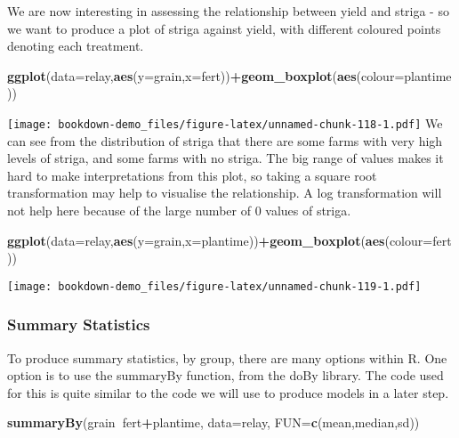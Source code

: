 \documentclass[]{book}
\newenvironment{Shaded}{\begin{snugshade}}{\end{snugshade}}
\newcommand{\KeywordTok}[1]{\textcolor[rgb]{0.13,0.29,0.53}{\textbf{#1}}}
\newcommand{\DataTypeTok}[1]{\textcolor[rgb]{0.13,0.29,0.53}{#1}}
\newcommand{\OperatorTok}[1]{\textcolor[rgb]{0.81,0.36,0.00}{\textbf{#1}}}
\newcommand{\NormalTok}[1]{#1}
\theoremstyle{definition}
\theoremstyle{definition}
\theoremstyle{definition}
\theoremstyle{remark}
\begin{document}
We are now interesting in assessing the relationship between yield and
striga - so we want to produce a plot of striga against yield, with
different coloured points denoting each treatment.

\begin{Shaded}
\begin{Highlighting}[]
\KeywordTok{ggplot}\NormalTok{(}\DataTypeTok{data=}\NormalTok{relay,}\KeywordTok{aes}\NormalTok{(}\DataTypeTok{y=}\NormalTok{grain,}\DataTypeTok{x=}\NormalTok{fert))}\OperatorTok{+}\KeywordTok{geom_boxplot}\NormalTok{(}\KeywordTok{aes}\NormalTok{(}\DataTypeTok{colour=}\NormalTok{plantime))}
\end{Highlighting}
\end{Shaded}

\texttt{[image: bookdown-demo\_files/figure-latex/unnamed-chunk-118-1.pdf]}
We can see from the distribution of striga that there are some farms
with very high levels of striga, and some farms with no striga. The big
range of values makes it hard to make interpretations from this plot, so
taking a square root transformation may help to visualise the
relationship. A log transformation will not help here because of the
large number of 0 values of striga.

\begin{Shaded}
\begin{Highlighting}[]
\KeywordTok{ggplot}\NormalTok{(}\DataTypeTok{data=}\NormalTok{relay,}\KeywordTok{aes}\NormalTok{(}\DataTypeTok{y=}\NormalTok{grain,}\DataTypeTok{x=}\NormalTok{plantime))}\OperatorTok{+}\KeywordTok{geom_boxplot}\NormalTok{(}\KeywordTok{aes}\NormalTok{(}\DataTypeTok{colour=}\NormalTok{fert))}
\end{Highlighting}
\end{Shaded}

\texttt{[image: bookdown-demo\_files/figure-latex/unnamed-chunk-119-1.pdf]}

\subsubsection{Summary Statistics}\label{summary-statistics-2}

To produce summary statistics, by group, there are many options within
R. One option is to use the summaryBy function, from the doBy library.
The code used for this is quite similar to the code we will use to
produce models in a later step.

\begin{Shaded}
\begin{Highlighting}[]
\KeywordTok{summaryBy}\NormalTok{(grain}\OperatorTok{~}\NormalTok{fert}\OperatorTok{+}\NormalTok{plantime, }\DataTypeTok{data=}\NormalTok{relay, }\DataTypeTok{FUN=}\KeywordTok{c}\NormalTok{(mean,median,sd))}
\end{Highlighting}
\end{Shaded}
\end{document}

